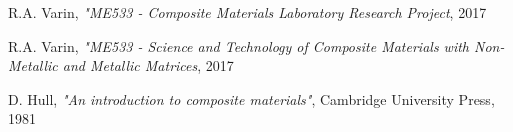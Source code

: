 \documentclass[11pt]{article}
\begin{document}
\newpage
\begin{thebibliography}{9}

R.A. Varin, \textit{"ME533 - Composite Materials Laboratory Research Project}, 2017

R.A. Varin, \textit{"ME533 - Science and Technology of Composite Materials with Non-Metallic and Metallic Matrices}, 2017

D. Hull, \textit{"An introduction to composite materials"}, Cambridge University Press, 1981

\end{thebibliography}
\end{document}
